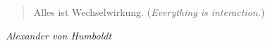 \thispagestyle{empty}
\vspace*{\fill}


\begin{quote}
   Alles ist Wechselwirkung. (\textsl{Everything is interaction.})
\end{quote}

\begin{flushright}
    \textit{Alexander von Humboldt}
\end{flushright} 

